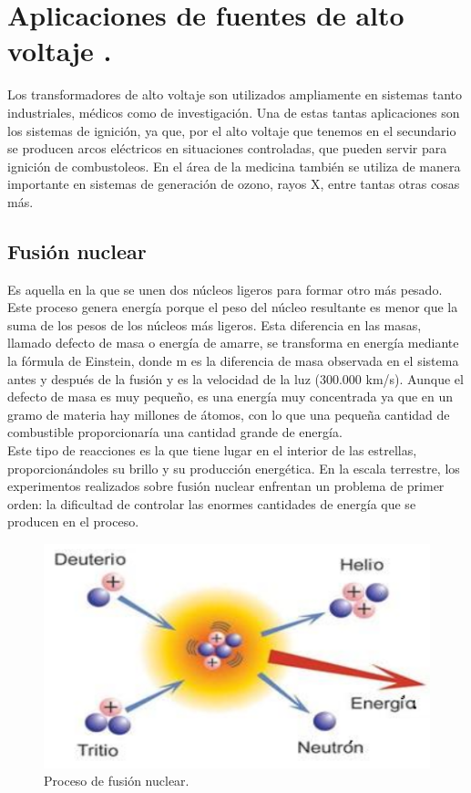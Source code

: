 \section{Aplicaciones de fuentes de alto voltaje .}

Los transformadores de alto voltaje son utilizados ampliamente en sistemas tanto industriales, médicos como de investigación. Una de estas tantas aplicaciones son los sistemas de ignición, ya que, por el alto voltaje que tenemos en el secundario se producen arcos eléctricos en situaciones controladas, que pueden servir para ignición de combustoleos. En el área de la medicina también se utiliza de manera importante en sistemas de generación de ozono, rayos X, entre tantas otras cosas más.  \\
\subsection{Fusión nuclear}

Es aquella en la que se unen dos núcleos ligeros para formar otro más pesado. Este proceso genera energía porque el peso del núcleo resultante es menor que la suma de los pesos de los núcleos más ligeros. Esta diferencia en las masas, llamado defecto de masa o energía de amarre, se transforma en energía mediante la fórmula de Einstein, donde m es la diferencia de masa observada en el sistema antes y después de la fusión y es la velocidad de la luz (300.000 km/s). Aunque el defecto de masa es muy pequeño, es una energía muy concentrada ya que en un gramo de materia hay millones de átomos, con lo que una pequeña cantidad de combustible proporcionaría una cantidad grande de energía.\\

Este tipo de reacciones es la que tiene lugar en el interior de las estrellas, proporcionándoles su brillo y su producción energética. En la escala terrestre, los experimentos realizados sobre fusión nuclear enfrentan un problema de primer orden: la dificultad de controlar las enormes cantidades de energía que se producen en el proceso.


\begin{figure}[H]
\centering
\includegraphics[width=12cm]{capitulo3/figs/fusi.png}
\caption{ Proceso de fusión nuclear.}
\end{figure}

